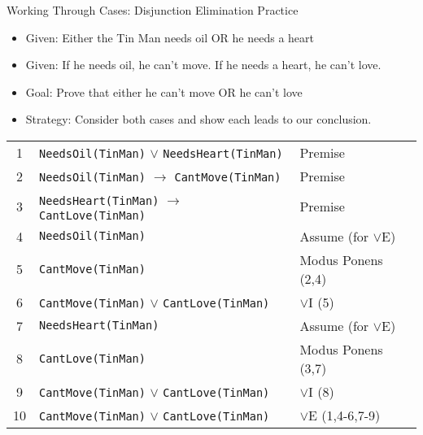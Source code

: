 \documentclass{beamer}
\begin{document}
	\begin{frame}{Working Through Cases: Disjunction Elimination Practice}
		\begin{itemize}
			\item Given: Either the Tin Man needs oil OR he needs a heart
			\item Given: If he needs oil, he can't move. If he needs a heart, he can't love.
			\item Goal: Prove that either he can't move OR he can't love
			\item Strategy: Consider both cases and show each leads to our conclusion.
		\end{itemize}
		
		\begin{example}
			\footnotesize
			\begin{tabular}{|c|l|l|}
				\hline
				1 & \texttt{NeedsOil(TinMan)} $\lor$ \texttt{NeedsHeart(TinMan)} & Premise \\
				2 & \texttt{NeedsOil(TinMan)} $\rightarrow$ \texttt{CantMove(TinMan)} & Premise \\
				3 & \texttt{NeedsHeart(TinMan)} $\rightarrow$ \texttt{CantLove(TinMan)} & Premise \\
				\hline
				4 & \quad \texttt{NeedsOil(TinMan)} & Assume (for $\lor$E) \\
				5 & \quad \texttt{CantMove(TinMan)} & Modus Ponens (2,4) \\
				6 & \quad \texttt{CantMove(TinMan)} $\lor$ \texttt{CantLove(TinMan)} & $\lor$I (5) \\
				\hline
				7 & \quad \texttt{NeedsHeart(TinMan)} & Assume (for $\lor$E) \\
				8 & \quad \texttt{CantLove(TinMan)} & Modus Ponens (3,7) \\
				9 & \quad \texttt{CantMove(TinMan)} $\lor$ \texttt{CantLove(TinMan)} & $\lor$I (8) \\
				\hline
				10 & \texttt{CantMove(TinMan)} $\lor$ \texttt{CantLove(TinMan)} & $\lor$E (1,4-6,7-9) \\
				\hline
			\end{tabular}
		\end{example}
	\end{frame}
	
\end{document}
